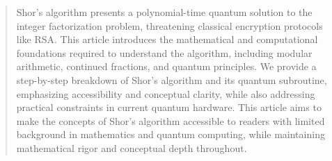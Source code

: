 \thispagestyle{empty}

\vspace*{1.0cm}

\begin{abstract}
    Shor’s algorithm presents a polynomial-time quantum solution to the integer factorization problem, threatening classical encryption protocols like RSA. This article introduces the mathematical and computational foundations required to understand the algorithm, including modular arithmetic, continued fractions, and quantum principles. We provide a step-by-step breakdown of Shor’s algorithm and its quantum subroutine, emphasizing accessibility and conceptual clarity, while also addressing practical constraints in current quantum hardware. This article aims to make the concepts of Shor's algorithm accessible to readers with limited background in mathematics and quantum computing, while maintaining mathematical rigor and conceptual depth throughout.
\end{abstract}
